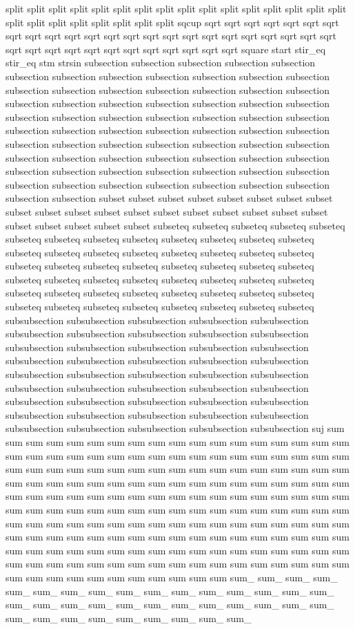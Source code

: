 split split split split split split split split split split split split split split split split split split split split split split split split sqcup sqrt sqrt sqrt sqrt sqrt sqrt sqrt sqrt sqrt sqrt sqrt sqrt sqrt sqrt sqrt sqrt sqrt sqrt sqrt sqrt sqrt sqrt sqrt sqrt sqrt sqrt sqrt sqrt sqrt sqrt sqrt sqrt sqrt sqrt sqrt sqrt square start stir_eq stir_eq stm strsin subsection subsection subsection subsection subsection subsection subsection subsection subsection subsection subsection subsection subsection subsection subsection subsection subsection subsection subsection subsection subsection subsection subsection subsection subsection subsection subsection subsection subsection subsection subsection subsection subsection subsection subsection subsection subsection subsection subsection subsection subsection subsection subsection subsection subsection subsection subsection subsection subsection subsection subsection subsection subsection subsection subsection subsection subsection subsection subsection subsection subsection subsection subsection subsection subsection subsection subsection subsection subsection subsection subset subset subset subset subset subset subset subset subset subset subset subset subset subset subset subset subset subset subset subset subset subset subset subset subseteq subseteq subseteq subseteq subseteq subseteq subseteq subseteq subseteq subseteq subseteq subseteq subseteq subseteq subseteq subseteq subseteq subseteq subseteq subseteq subseteq subseteq subseteq subseteq subseteq subseteq subseteq subseteq subseteq subseteq subseteq subseteq subseteq subseteq subseteq subseteq subseteq subseteq subseteq subseteq subseteq subseteq subseteq subseteq subseteq subseteq subseteq subseteq subseteq subseteq subseteq subseteq subseteq subsubsection subsubsection subsubsection subsubsection subsubsection subsubsection subsubsection subsubsection subsubsection subsubsection subsubsection subsubsection subsubsection subsubsection subsubsection subsubsection subsubsection subsubsection subsubsection subsubsection subsubsection subsubsection subsubsection subsubsection subsubsection subsubsection subsubsection subsubsection subsubsection subsubsection subsubsection subsubsection subsubsection subsubsection subsubsection subsubsection subsubsection subsubsection subsubsection subsubsection subsubsection subsubsection subsubsection subsubsection subsubsection suj sum sum sum sum sum sum sum sum sum sum sum sum sum sum sum sum sum sum sum sum sum sum sum sum sum sum sum sum sum sum sum sum sum sum sum sum sum sum sum sum sum sum sum sum sum sum sum sum sum sum sum sum sum sum sum sum sum sum sum sum sum sum sum sum sum sum sum sum sum sum sum sum sum sum sum sum sum sum sum sum sum sum sum sum sum sum sum sum sum sum sum sum sum sum sum sum sum sum sum sum sum sum sum sum sum sum sum sum sum sum sum sum sum sum sum sum sum sum sum sum sum sum sum sum sum sum sum sum sum sum sum sum sum sum sum sum sum sum sum sum sum sum sum sum sum sum sum sum sum sum sum sum sum sum sum sum sum sum sum sum sum sum sum sum sum sum sum sum sum sum sum sum sum sum sum sum sum sum sum sum sum sum sum_ sum_ sum_ sum_ sum_ sum_ sum_ sum_ sum_ sum_ sum_ sum_ sum_ sum_ sum_ sum_ sum_ sum_ sum_ sum_ sum_ sum_ sum_ sum_ sum_ sum_ sum_ sum_ sum_ sum_ sum_ sum_ sum_ sum_ sum_ sum_ sum_ 